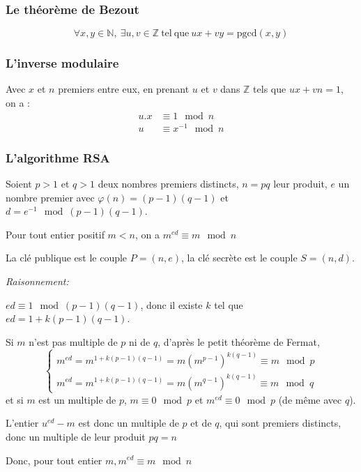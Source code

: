 \subsubsection{Le théorème de Bezout}
$$ \forall x,y \in \mathbb{N},\ \exists u , v \in \mathbb{Z}\ \mathrm{tel\ que}\ ux+vy=\mathrm{pgcd}(x,y) $$

\subsubsection{L'inverse modulaire}
Avec $x$ et $n$ premiers entre eux, en prenant $u$ et $v$ dans $\mathbb{Z}$ tels que
$ux+vn=1$, on a : 
\begin{align*} 
  u.x &\equiv 1  \mod n  \\
  u &\equiv x^{-1} \mod n 
\end{align*}

\subsubsection{L'algorithme RSA}

Soient $p>1$ et $q>1$ deux nombres premiers distincts, $n=pq$ leur produit,
 $e$ un nombre premier avec 
$\varphi(n) = (p−1)(q−1)$ et $d = e^{−1} \mod{(p−1)(q−1)}$.

Pour tout entier positif $m<n$, on a $m^{ed} ≡ m \mod n$

La clé publique  est le couple $P=(n,e)$,
la clé secrète est le couple $S=(n,d)$.

\textit{Raisonnement:}

$ed≡1 \mod (p−1)(q−1)$, donc il existe $k$ tel que $ed=1+k(p−1)(q−1)$.

Si $m$ n’est pas multiple de $p$ ni de $q$, 
d’après le petit théorème de Fermat,
$$
\begin{cases}
  m^{ed}= m^{1+k(p−1)(q−1)} = m (m^{p-1})^{k(q-1)} \equiv m \mod p \\ 
 
  m^{ed}= m^{1+k(p−1)(q−1)} = m (m^{q-1})^{k(q-1)} \equiv m \mod q
\end{cases}
$$
et si $m$ est un multiple de $p$, $m≡0 \mod p$ et $m^{ed}≡0 \mod p$ (de même avec $q$).

 L’entier $u^{ed}−m$ est donc un multiple de $p$ et de $q$, qui sont premiers distincts, 
 donc un multiple de leur produit $pq=n$

 Donc, pour tout entier $m, m^{ed} ≡ m \mod n$


